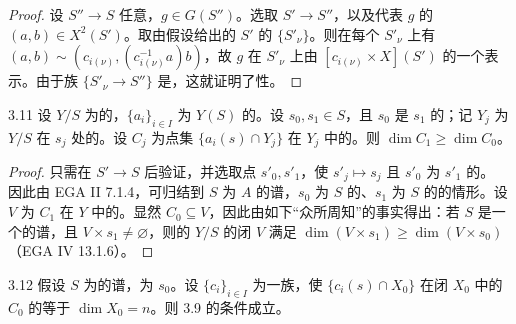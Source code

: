 \begin{proof}
设 $S''\to S$ 任意，$g\in G(S'')$。选取 $S'\to S''$，以及代表 $g$ 的 $(a,b)\in X^2(S')$。取由假设给出的 $S'$ 的 $\{S'_\nu\}$。则在每个 $S'_\nu$ 上有 $(a,b)\sim(c_{i(\nu)},(c_{i(\nu)}^{-1}a)b)$，故 $g$ 在 $S'_\nu$ 上由 $[c_{i(\nu)}\times X](S')$ 的一个表示。由于族 $\{S'_\nu\to S''\}$ 是，这就证明了性。
\end{proof}
\begin{SGAresult}{}{3.11}
设 $Y/S$ 为的，$\{a_i\}_{i\in I}$ 为 $Y(S)$ 的。设 $s_0,s_1\in S$，且 $s_0$ 是 $s_1$ 的；记 $Y_j$ 为 $Y/S$ 在 $s_j$ 处的。设 $C_j$ 为点集 $\{a_i(s)\cap Y_j\}$ 在 $Y_j$ 中的。则 $\dim C_1\geq\dim C_0$。
\end{SGAresult}
\begin{proof}
只需在 $S'\to S$ 后验证，并选取点 $s'_0,s'_1$，使 $s'_j\mapsto s_j$ 且 $s'_0$ 为 $s'_1$ 的。
因此由 EGA II 7.1.4，可归结到 $S$ 为 $A$ 的谱，$s_0$ 为 $S$ 的、$s_1$ 为 $S$ 的的情形。设 $V$ 为 $C_1$ 在 $Y$ 中的。显然 $C_0\subseteq V$，因此由如下“众所周知”的事实得出：若 $S$ 是一个的谱，且 $V\times s_1\neq\varnothing$，则的 $Y/S$ 的闭 $V$ 满足 $\dim(V\times s_1)\geq\dim(V\times s_0)$（EGA IV 13.1.6）。
\end{proof}
\begin{SGAresult}{}{3.12}
假设 $S$ 为的谱，为 $s_0$。设 $\{c_i\}_{i\in I}$ 为一族，使 $\{c_i(s)\cap X_0\}$ 在闭 $X_0$ 中的 $C_0$ 的等于 $\dim X_0=n$。则 3.9 的条件成立。
\end{SGAresult}
